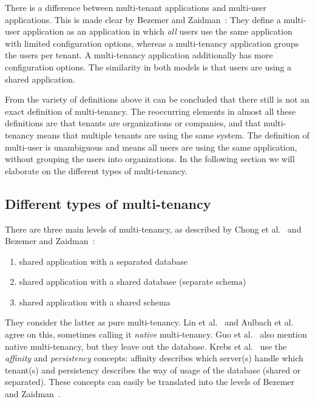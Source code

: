 There is a difference between multi-tenant applications and multi-user applications. This is made clear by Bezemer and Zaidman~\cite{bezemer2010multi}: They define a multi-user application as an application in which \emph{all} users use the same application with limited configuration options, whereas a multi-tenancy application groups the users per tenant. A multi-tenancy application additionally has more configuration options. The similarity in both models is that users are using a shared application. %

From the variety of definitions above it can be concluded that there still is not an exact definition of multi-tenancy. The reoccurring elements in almost all these definitions are that tenants are organizations or companies, and that multi-tenancy means that multiple tenants are using the same system. The definition of multi-user is unambiguous and means all users are using the same application, without grouping the users into organizations. In the following section we will elaborate on the different types of multi-tenancy. 

\subsection{Different types of multi-tenancy}

There are three main levels of multi-tenancy, as described by Chong et al.~\cite{chong2006multi} and Bezemer and Zaidman~\cite{bezemer2010multi}:
\begin{enumerate}
\item shared application with a separated database
\item shared application with a shared database (separate schema)
\item shared application with a shared schema
\end{enumerate}
They consider the latter as pure multi-tenancy. Lin et al.~\cite{lin2009feedback} and Aulbach et al.~\cite{aulbach2009comparison} agree on this, sometimes calling it \emph{native} multi-tenancy. Guo et al.~\cite{guo2007framework} also mention native multi-tenancy, but they leave out the database. Krebs et al.~\cite{krebs2012architecture} use the \emph{affinity} and \emph{persistency} concepts: affinity describes which server(s) handle which tenant(s) and persistency describes the way of usage of the database (shared or separated). These concepts can easily be translated into the levels of Bezemer and Zaidman~\cite{bezemer2010multi}. 

